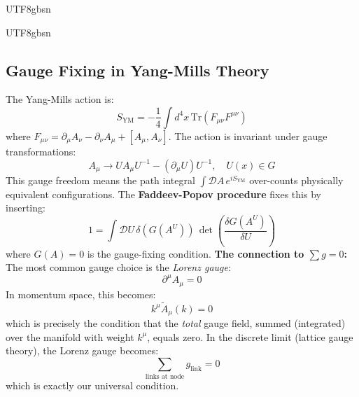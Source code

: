\documentclass[11pt,a4paper]{article}
\begin{document}
\begin{CJK}{UTF8}{gbsn}
{\begin{CJK}{UTF8}{gbsn}
\subsection{Gauge Fixing in Yang-Mills Theory}
The Yang-Mills action is:
\begin{equation}
    S_{\text{YM}} = -\frac{1}{4} \int d^4x \, \mathrm{Tr}(F_{\mu\nu}F^{\mu\nu})
\end{equation}
where $F_{\mu\nu} = \partial_\mu A_\nu - \partial_\nu A_\mu + [A_\mu, A_\nu]$.
The action is invariant under gauge transformations:
\begin{equation}
    A_\mu \to U A_\mu U^{-1} - (\partial_\mu U) U^{-1}, \quad U(x) \in G
\end{equation}
This gauge freedom means the path integral $\int \mathcal{D}A \, e^{iS_{\text{YM}}}$
over-counts physically equivalent configurations. The \textbf{Faddeev-Popov procedure}
fixes this by inserting:
\begin{equation}
    1 = \int \mathcal{D}U \, \delta(G(A^U)) \, \det\left(\frac{\delta G(A^U)}{\delta U}\right)
\end{equation}
where $G(A) = 0$ is the gauge-fixing condition.
\textbf{The connection to $\sum g = 0$:} The most common gauge choice is the
\textit{Lorenz gauge}:
\begin{equation}
    \partial^\mu A_\mu = 0
\end{equation}
In momentum space, this becomes:
\begin{equation}
    k^\mu \tilde{A}_\mu(k) = 0
\end{equation}
which is precisely the condition that the \textit{total} gauge field, summed (integrated)
over the manifold with weight $k^\mu$, equals zero. In the discrete limit (lattice gauge
theory), the Lorenz gauge becomes:
\begin{equation}
    \sum_{\text{links at node}} g_{\text{link}} = 0
\end{equation}
which is exactly our universal condition.

\end{CJK}}
\end{CJK}
\end{document}

